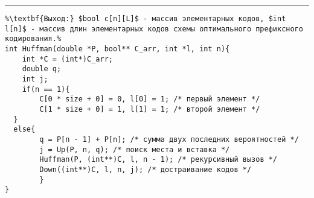 \vspace{5pt} \hrule
\begin{lstlisting}[caption={Построение оптимальной схемы - рекурсивная процедура Huffman}, label=p_219, escapechar=\%]
%\noindent\textbf{Вход:} $n$ количество букв, $double P[n]$ - массив вероятностей букв, упорядоченный по убыванию.\\%
%\textbf{Выход:} $bool c[n][L]$ - массив элементарных кодов, $int l[n]$ - массив длин элементарных кодов схемы оптимального префиксного кодирования.%
int Huffman(double *P, bool** C_arr, int *l, int n){
	int *C = (int*)C_arr;
	double q;
	int j;
	if(n == 1){
        C[0 * size + 0] = 0, l[0] = 1; /* первый элемент */
        C[1 * size + 0] = 1, l[1] = 1; /* второй элемент */
  }
  else{
        q = P[n - 1] + P[n]; /* сумма двух последних вероятностей */
        j = Up(P, n, q); /* поиск места и вставка */
        Huffman(P, (int**)C, l, n - 1); /* рекурсивный вызов */
        Down((int**)C, l, n, j); /* достраивание кодов */
        }
}
\end{lstlisting}
